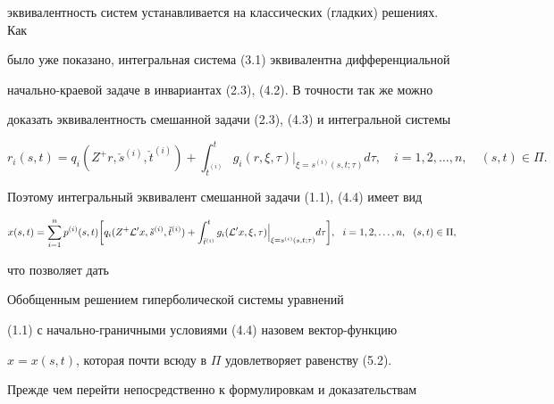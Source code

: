 эквивалентность систем устанавливается на классических (гладких) решениях. Как


было уже показано, интегральная система (3.1) эквивалентна дифференциальной 


начально-краевой задаче в инвариантах (2.3), (4.2). В точности так же можно 


доказать эквивалентность смешанной задачи (2.3), (4.3) и интегральной системы


\begin{equation} 


r_i (s,t)=q_i (Z^{+}r, \check{s}^{(i)}, \check{t}^{(i)}) +


\int_{\check{t}^{(i)}}^{t}


g_{i} (r, \xi, \tau) \Big|_{\xi=s^{(i)}(s,t; \tau)}


d\tau,\quad i=1,2,\dotsc, n,\quad (s,t) \in {\Pi}.


\end{equation}


Поэтому интегральный эквивалент смешанной задачи (1.1), (4.4) имеет вид


\begin{equation} 


x (s,t)=\sum_{i=1}^n p^{(i)} (s,t) \bigg[ q_i (Z^{+}


{\cal L}^{\prime} x, \check{s}^{(i)}, \check{t}^{(i)}) +


\int_{\check{t}^{(i)}}^{t}g_{i} ({\cal L}^{\prime}x, \xi, \tau)


\Big|_{\xi=s^{(i)}(s,t; \tau)} d\tau \bigg], 


\ \ i=1,2,\dotsc, n,\ \ (s,t) \in {\Pi},


\end{equation}


что позволяет дать





\begin{defns}


Обобщенным решением гиперболической системы уравнений 


(1.1) с на\-чаль\-но-гра\-нич\-ны\-ми условиями (4.4) назовем вектор-функцию 


$x=x(s,t)$, которая почти всюду в $\Pi$ удовлетворяет равенству (5.2).


\end{defns}





Прежде чем перейти непосредственно к формулировкам и доказательствам 



